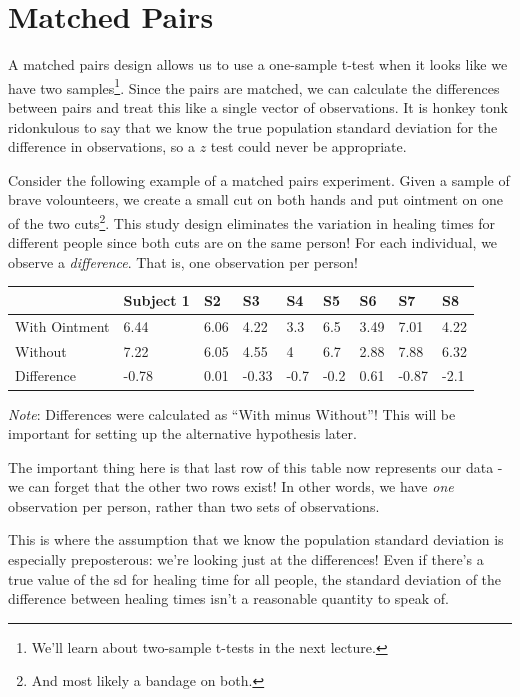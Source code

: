 \documentclass[
  letterpaper,
  DIV=11,
  numbers=noendperiod,
  oneside]{scrreprt}
\begin{document}
\hypertarget{matched-pairs}{%
\section{Matched Pairs}\label{matched-pairs}}

A matched pairs design allows us to use a one-sample t-test when it
looks like we have two samples\footnote{We'll learn about two-sample
  t-tests in the next lecture.}. Since the pairs are matched, we can
calculate the differences between pairs and treat this like a single
vector of observations. It is honkey tonk ridonkulous to say that we
know the true population standard deviation for the difference in
observations, so a \(z\) test could never be appropriate.

Consider the following example of a matched pairs experiment. Given a
sample of brave volounteers, we create a small cut on both hands and put
ointment on one of the two cuts\footnote{And most likely a bandage on
  both.}. This study design eliminates the variation in healing times
for different people since both cuts are on the same person! For each
individual, we observe a \emph{difference}. That is, one observation per
person!

\begin{longtable}[]{@{}lllllllll@{}}
\toprule\noalign{}
& Subject 1 & S2 & S3 & S4 & S5 & S6 & S7 & S8 \\
\midrule\noalign{}
\endhead
\bottomrule\noalign{}
\endlastfoot
With Ointment & 6.44 & 6.06 & 4.22 & 3.3 & 6.5 & 3.49 & 7.01 & 4.22 \\
Without & 7.22 & 6.05 & 4.55 & 4 & 6.7 & 2.88 & 7.88 & 6.32 \\
Difference & -0.78 & 0.01 & -0.33 & -0.7 & -0.2 & 0.61 & -0.87 & -2.1 \\
\end{longtable}

\emph{Note}: Differences were calculated as ``With minus Without''! This
will be important for setting up the alternative hypothesis later.

The important thing here is that last row of this table now represents
our data - we can forget that the other two rows exist! In other words,
we have \emph{one} observation per person, rather than two sets of
observations.

This is where the assumption that we know the population standard
deviation is especially preposterous: we're looking just at the
differences! Even if there's a true value of the sd for healing time for
all people, the standard deviation of the difference between healing
times isn't a reasonable quantity to speak of.
\end{document}
